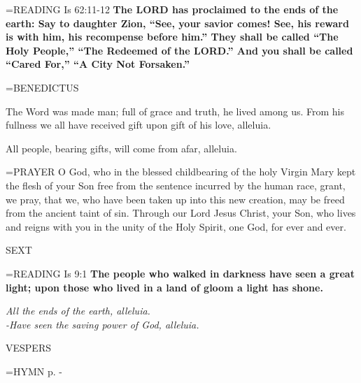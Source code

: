 \hangindent=\parindent \small{READING}    Is 62:11-12 \textbf{   The LORD has proclaimed to the ends of the earth: Say to daughter Zion, “See, your savior comes! See, his reward is with him, his recompense before him.” They shall be called “The Holy People,” “The Redeemed of the LORD.” And you shall be called “Cared For,” “A City Not Forsaken.”\\}

\hangindent=\parindent \small BENEDICTUS
\begin{description}[labelindent=\parindent, noitemsep, leftmargin=*]
\item [(before the Epiphany):]  The Word was made man; full of grace and truth, he lived among us. From his fullness we all have received gift upon gift of his love, alleluia.
\item [(Thursday after the Epiphany):]  All people, bearing gifts, will come from afar, alleluia.
\end{description}


\hangindent=\parindent \small{PRAYER 	O God, who in the blessed childbearing of the holy Virgin Mary kept the flesh of your Son free from the sentence incurred by the human race, grant, we pray, that we, who have been taken up into this new creation, may be freed from the ancient taint of sin. Through our Lord Jesus Christ, your Son, who lives and reigns with you in the unity of the Holy Spirit, one God, for ever and ever.}

\begin{flushleft}\normalsize SEXT\\\end{flushleft}

\hangindent=\parindent \small{READING}    Is 9:1 \textbf{   The people who walked in darkness have seen a great light; upon those who lived in a land of gloom a light has shone.}

\begin{center}
\textit{All the ends of the earth, alleluia.\\
-Have seen the saving power of God, alleluia.}
\end{center}

\begin{flushleft}\normalsize VESPERS\\\end{flushleft}

\hangindent=\parindent \small{\uppercase{HYMN} p.  \pageref{christmas:firstHymn} - \pageref{christmas:lastHymn}\\}

